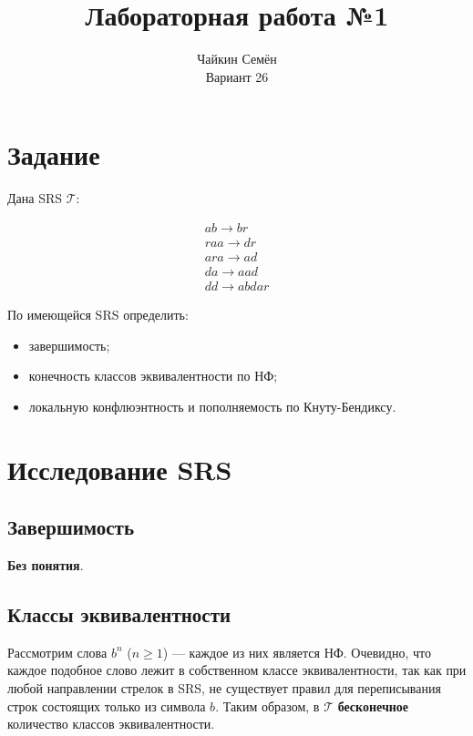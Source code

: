 \documentclass[a4paper, 12pt]{article}
\title{Лабораторная работа №1}
\author{Чайкин Семён\\Вариант 26}
\newcommand{\T}{\mathcal{T}}
\begin{document}
    \maketitle
    \tableofcontents
    \newpage

    \section{Задание}    

    Дана SRS $\T$:

    \begin{gather*}
        ab  \to br\\
        raa \to dr\\
        ara \to ad\\
        da  \to aad\\
        dd  \to abdar 
    \end{gather*}

    По имеющейся SRS определить:

    \begin{itemize}
        \itemsep -0.8pt
        \item[---] завершимость;
        \item[---] конечность классов эквивалентности по НФ;
        \item[---] локальную конфлюэнтность и пополняемость по Кнуту-Бендиксу.
    \end{itemize}

    \section{Исследование SRS}

    \subsection{Завершимость}

    \textbf{Без понятия}.
    
    \subsection{Классы эквивалентности}

    Рассмотрим слова $b^n$ ($n \geq 1$) --- каждое из них является НФ. Очевидно, что каждое подобное слово лежит в собственном классе эквивалентности, так как при любой направлении стрелок в SRS, не существует правил для переписывания строк состоящих только из символа $b$. Таким образом, в $\T$ \textbf{бесконечное} количество классов эквивалентности.
\end{document}
